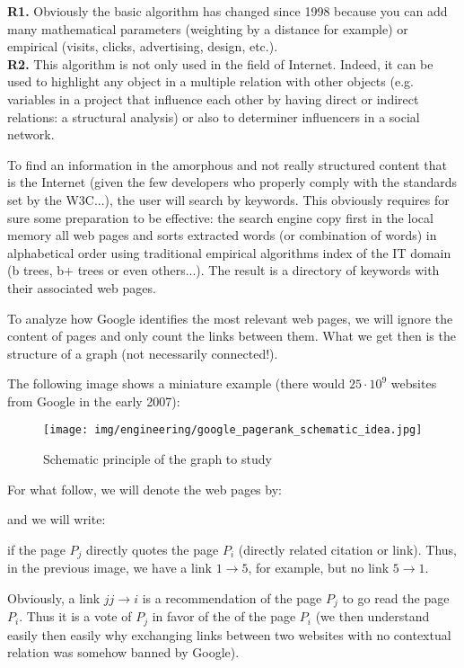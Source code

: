	\begin{tcolorbox}[title=Remark,colframe=black,arc=10pt]
	\textbf{R1.} Obviously the basic algorithm has changed since 1998 because you can add many mathematical parameters (weighting by a distance for example) or empirical (visits, clicks, advertising, design, etc.).\\
	
	\textbf{R2.} This algorithm is not only used in the field of Internet. Indeed, it can be used to highlight any object in a multiple relation with other objects (e.g. variables in a project that influence each other by having direct or indirect relations: a structural analysis) or also to determiner influencers in a social network.
	\end{tcolorbox}
	
	To find an information in the amorphous and not really structured content that is the Internet (given the few developers who properly comply with the standards set by the W3C...), the user will search by keywords. This obviously requires for sure some preparation to be effective: the search engine copy first in the local memory all web pages and sorts extracted words (or combination of words) in alphabetical order using traditional empirical algorithms index of the IT domain (b trees, b+ trees or even others...). The result is a directory of keywords with their associated web pages.
	
	To analyze how Google identifies the most relevant web pages, we will ignore the content of pages and only count the links between them. What we get then is the structure of a graph (not necessarily connected!).
	
	The following image shows a miniature example (there would $25\cdot 10^9$ websites from Google in the early 2007):
	\begin{figure}[H]
		\centering
		\texttt{[image: img/engineering/google\_pagerank\_schematic\_idea.jpg]}
		\caption{Schematic principle of the graph to study}
	\end{figure}
	For what follow, we will denote the web pages by:
	
	and we will write:
	
	if the page $P_j$ directly quotes the page $P_i$ (directly related citation or link). Thus, in the previous image, we have a link $1\longrightarrow 5$, for example, but no link $5\longrightarrow 1$.
	
	Obviously, a link $jj\longrightarrow i$ is a recommendation of the page $P_j$ to go read the page $P_i$. Thus it is a vote of $P_j$ in favor of the of the page $P_i$ (we then understand easily then easily why exchanging links between two websites with no contextual relation was somehow banned by Google).
	
